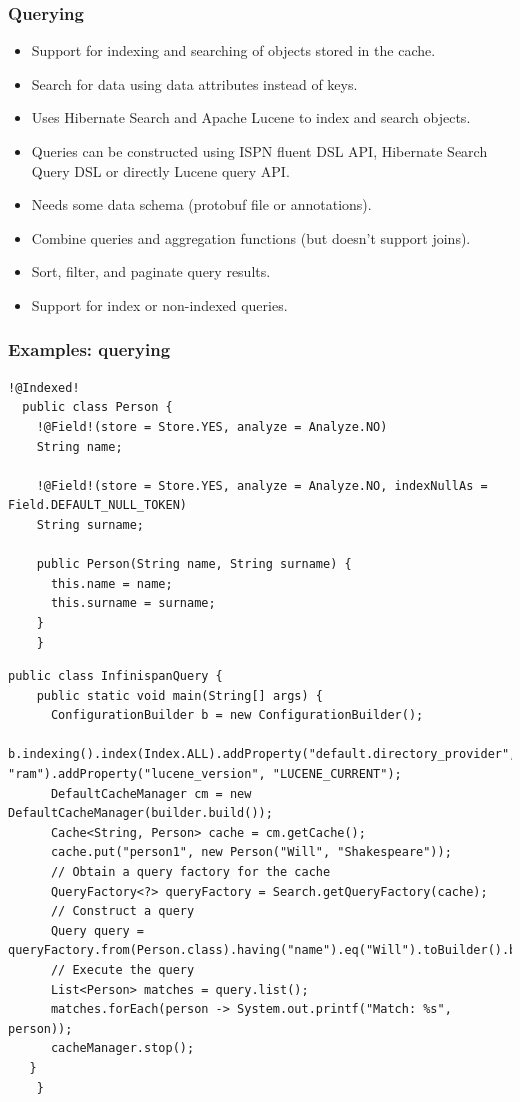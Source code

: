 \documentclass[10pt,utf8]{beamer}
\begin{document}
\begin{frame}
	\frametitle{Querying}
	\begin{itemize}
		\item Support for indexing and searching of objects stored in the cache.
		\pause
		\item Search for data using data attributes instead of keys.
		\pause
		\item Uses Hibernate Search and Apache Lucene to index and search objects.
		\pause
		\item Queries can be constructed using ISPN fluent DSL API, Hibernate Search Query DSL or directly Lucene query API.
		\pause
		\item Needs some data schema (protobuf file or annotations).
		\pause
		\item Combine queries and aggregation functions (but doesn't support joins).
		\pause
		\item Sort, filter, and paginate query results.
		\pause
		\item Support for index or non-indexed queries.
	\end{itemize}
\end{frame}

\begin{frame}[fragile]
	\frametitle{Examples: querying}
	\begin{lstlisting}[style=Java]
  !@Indexed!
  public class Person {
    !@Field!(store = Store.YES, analyze = Analyze.NO)
    String name;

    !@Field!(store = Store.YES, analyze = Analyze.NO, indexNullAs = Field.DEFAULT_NULL_TOKEN)
    String surname;

    public Person(String name, String surname) {
      this.name = name;
      this.surname = surname;
    }
	}
	\end{lstlisting}
\end{frame}

\begin{frame}[fragile]
	\begin{lstlisting}[style=Java]
	public class InfinispanQuery {
    public static void main(String[] args) {
      ConfigurationBuilder b = new ConfigurationBuilder();
      b.indexing().index(Index.ALL).addProperty("default.directory_provider", "ram").addProperty("lucene_version", "LUCENE_CURRENT");
      DefaultCacheManager cm = new DefaultCacheManager(builder.build());
      Cache<String, Person> cache = cm.getCache();
      cache.put("person1", new Person("Will", "Shakespeare"));
      // Obtain a query factory for the cache
      QueryFactory<?> queryFactory = Search.getQueryFactory(cache);
      // Construct a query
      Query query = queryFactory.from(Person.class).having("name").eq("Will").toBuilder().build();
      // Execute the query
      List<Person> matches = query.list();
      matches.forEach(person -> System.out.printf("Match: %s", person));
      cacheManager.stop();
   }
	}
	\end{lstlisting}
\end{frame}
\end{document}
